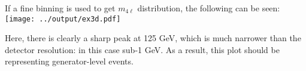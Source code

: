 \documentclass[a4paper]{article}
\begin{document}


If a fine binning is used to get $m_{4\ell}$ distribution, the following
can be seen:
% 
\texttt{[image: ../output/ex3d.pdf]}

Here, there is clearly a sharp peak at 125 GeV, which is much narrower than
the detector resolution: in this case sub-1 GeV. As a result, this plot should
be representing generator-level events.
\end{document}
